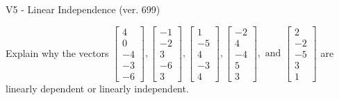 \begin{exercise}
  \begin{exerciseTitle}V5 - Linear Independence (ver. 699)\end{exerciseTitle}
  \begin{exerciseStatement}
    Explain why the vectors \(\left[\begin{array}{r}
4 \\
0 \\
-4 \\
-3 \\
-6
\end{array}\right] , \left[\begin{array}{r}
-1 \\
-2 \\
3 \\
-6 \\
3
\end{array}\right] , \left[\begin{array}{r}
1 \\
-5 \\
4 \\
-3 \\
4
\end{array}\right] , \left[\begin{array}{r}
-2 \\
4 \\
-4 \\
5 \\
3
\end{array}\right] , \text{ and } \left[\begin{array}{r}
2 \\
-2 \\
-5 \\
3 \\
1
\end{array}\right]\) are linearly dependent or linearly independent.	



\end{exerciseStatement}
\end{exercise}
